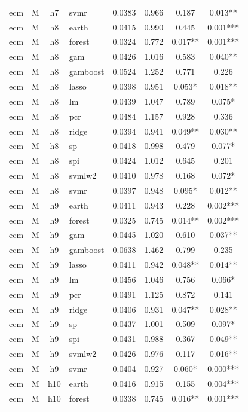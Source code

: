 \begin{ThreePartTable}
\begin{longtable}[t]{llclcccc}
ecm & M & h7 & svmr & 0.0383 & 0.966 & 0.187 & 0.013**\\
\addlinespace
ecm & M & h8 & earth & 0.0415 & 0.990 & 0.445 & 0.001***\\
ecm & M & h8 & forest & 0.0324 & 0.772 & 0.017** & 0.001***\\
ecm & M & h8 & gam & 0.0426 & 1.016 & 0.583 & 0.040**\\
ecm & M & h8 & gamboost & 0.0524 & 1.252 & 0.771 & 0.226\\
ecm & M & h8 & lasso & 0.0398 & 0.951 & 0.053* & 0.018**\\
ecm & M & h8 & lm & 0.0439 & 1.047 & 0.789 & 0.075*\\
ecm & M & h8 & pcr & 0.0484 & 1.157 & 0.928 & 0.336\\
ecm & M & h8 & ridge & 0.0394 & 0.941 & 0.049** & 0.030**\\
ecm & M & h8 & sp & 0.0418 & 0.998 & 0.479 & 0.077*\\
ecm & M & h8 & spi & 0.0424 & 1.012 & 0.645 & 0.201\\
ecm & M & h8 & svmlw2 & 0.0410 & 0.978 & 0.168 & 0.072*\\
ecm & M & h8 & svmr & 0.0397 & 0.948 & 0.095* & 0.012**\\
\addlinespace
ecm & M & h9 & earth & 0.0411 & 0.943 & 0.228 & 0.002***\\
ecm & M & h9 & forest & 0.0325 & 0.745 & 0.014** & 0.002***\\
ecm & M & h9 & gam & 0.0445 & 1.020 & 0.610 & 0.037**\\
ecm & M & h9 & gamboost & 0.0638 & 1.462 & 0.799 & 0.235\\
ecm & M & h9 & lasso & 0.0411 & 0.942 & 0.048** & 0.014**\\
ecm & M & h9 & lm & 0.0456 & 1.046 & 0.756 & 0.066*\\
ecm & M & h9 & pcr & 0.0491 & 1.125 & 0.872 & 0.141\\
ecm & M & h9 & ridge & 0.0406 & 0.931 & 0.047** & 0.028**\\
ecm & M & h9 & sp & 0.0437 & 1.001 & 0.509 & 0.097*\\
ecm & M & h9 & spi & 0.0431 & 0.988 & 0.367 & 0.049**\\
ecm & M & h9 & svmlw2 & 0.0426 & 0.976 & 0.117 & 0.016**\\
ecm & M & h9 & svmr & 0.0404 & 0.927 & 0.060* & 0.000***\\
\addlinespace
ecm & M & h10 & earth & 0.0416 & 0.915 & 0.155 & 0.004***\\
ecm & M & h10 & forest & 0.0338 & 0.745 & 0.016** & 0.001***\\

\end{longtable}
\end{ThreePartTable}
